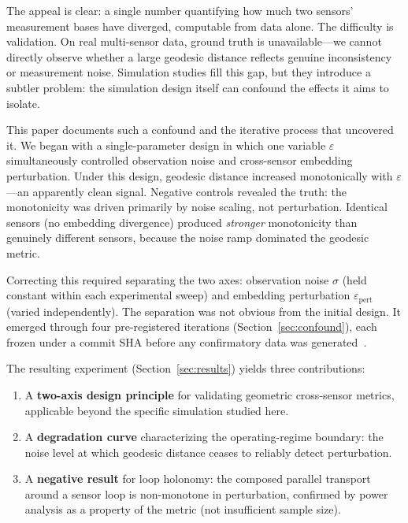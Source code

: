 \documentclass[11pt]{article}
\newcommand{\eps}{\varepsilon}
\newcommand{\epspert}{\eps_\mathrm{pert}}
\begin{document}
The appeal is clear: a single number quantifying how much two
sensors' measurement bases have diverged, computable from data
alone.  The difficulty is validation.  On real multi-sensor data,
ground truth is unavailable---we cannot directly observe whether a
large geodesic distance reflects genuine inconsistency or
measurement noise.  Simulation studies fill this gap, but they
introduce a subtler problem: the simulation design itself can
confound the effects it aims to isolate.

This paper documents such a confound and the iterative process that
uncovered it.  We began with a single-parameter design in which one
variable $\eps$ simultaneously controlled observation noise and
cross-sensor embedding perturbation.  Under this design, geodesic
distance increased monotonically with $\eps$---an apparently clean
signal.  Negative controls revealed the truth: the monotonicity was
driven primarily by noise scaling, not perturbation.  Identical
sensors (no embedding divergence) produced \emph{stronger}
monotonicity than genuinely different sensors, because the noise
ramp dominated the geodesic metric.

Correcting this required separating the two axes: observation noise
$\sigma$ (held constant within each experimental sweep) and
embedding perturbation $\epspert$ (varied independently).  The
separation was not obvious from the initial design.  It emerged
through four pre-registered iterations (Section~\ref{sec:confound}),
each frozen under a commit SHA before any confirmatory data was
generated~\citep{nosek2018preregistration}.

The resulting experiment (Section~\ref{sec:results}) yields three
contributions:

\begin{enumerate}
  \item A \textbf{two-axis design principle} for validating
    geometric cross-sensor metrics, applicable beyond the specific
    simulation studied here.
  \item A \textbf{degradation curve} characterizing the
    operating-regime boundary: the noise level at which geodesic
    distance ceases to reliably detect perturbation.
  \item A \textbf{negative result} for loop holonomy: the composed
    parallel transport around a sensor loop is non-monotone in
    perturbation, confirmed by power analysis as a property of the
    metric (not insufficient sample size).
\end{enumerate}
\end{document}
